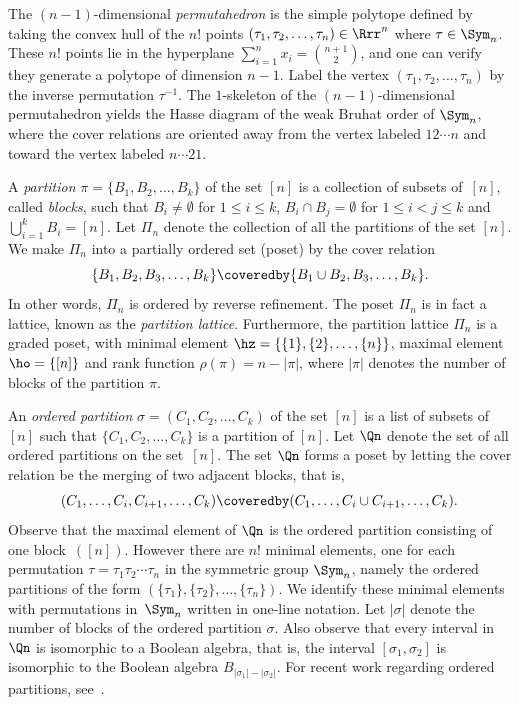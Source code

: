 The $(n-1)$-dimensional
\emph{permutahedron} 
is the simple polytope defined by
taking the convex hull of the $n!$ points 
$(\tau_{1}, \tau_{2}, \ldots, \tau_{n}) \in \Rrr^{n}$
where $\tau \in \Sym_{n}$.
These $n!$ points lie in the hyperplane
$\sum_{i=1}^{n} x_{i} = \binom{n+1}{2}$,
and one can verify
they generate a
polytope of dimension $n-1$.
Label the vertex
$(\tau_{1}, \tau_{2}, \ldots, \tau_{n})$ by the inverse permutation $\tau^{-1}$.
The $1$-skeleton of the $(n-1)$-dimensional permutahedron
yields the Hasse diagram of the weak Bruhat order of $\Sym_{n}$,
where the cover relations are oriented away from
the vertex labeled $12 \cdots n$ and toward the vertex labeled $n \cdots 21$.




A \emph{partition} $\pi = \{B_{1}, B_{2}, \ldots, B_{k}\}$
of the set $[n]$ is a collection of subsets of~$[n]$, called \emph{blocks},
such that $B_{i} \neq \emptyset$ for $1 \leq i \leq k$,
$B_{i} \cap B_{j} = \emptyset$ for $1 \leq i < j \leq k$
and
$\bigcup_{i=1}^{k} B_{i} = [n]$.
Let $\Pi_{n}$ denote
the collection of all the partitions of the set $[n]$.
We make $\Pi_{n}$ into a partially ordered set (poset)
by the cover relation
$$
  \{B_{1}, B_{2}, B_{3}, \ldots, B_{k}\}
  \coveredby
  \{B_{1} \cup B_{2}, B_{3}, \ldots, B_{k}\} .
$$
In other words, $\Pi_{n}$ is ordered by reverse refinement.
The poset $\Pi_{n}$ is in fact a lattice,
known as the \emph{partition lattice}.
Furthermore, the partition lattice $\Pi_{n}$ is a graded poset,
with minimal element
$\hz = \{\{1\}, \{2\}, \ldots, \{n\}\}$,
maximal element
$\ho = \{[n]\}$
and rank function
$\rho(\pi) = n-|\pi|$,
where
$|\pi|$ denotes the number of blocks of the partition $\pi$.



An \emph{ordered partition} 
$\sigma = (C_{1}, C_{2}, \ldots, C_{k})$
of the set $[n]$
is a list of subsets of $[n]$ such that
$\{C_{1}, C_{2}, \ldots, C_{k}\}$
is a partition of $[n]$.
Let $\Qn$ denote the set of all
ordered partitions on the set~$[n]$.
The set $\Qn$ forms a poset
by letting the cover relation
be the merging of two adjacent blocks, that is,
$$
(C_{1}, \ldots, C_{i}, C_{i+1}, \ldots, C_{k})
\coveredby
(C_{1}, \ldots, C_{i} \cup C_{i+1}, \ldots, C_{k}) .
$$
Observe that the maximal element of
$\Qn$ is
the ordered partition consisting of one block~$([n])$.
However there are $n!$ minimal elements,
one for each permutation $\tau = \tau_{1} \tau_{2} \cdots \tau_{n}$
in the symmetric group $\Sym_{n}$, namely
the ordered partitions of the form
$(\{\tau_{1}\}, \{\tau_{2}\}, \ldots, \{\tau_{n}\})$.
We identify these minimal elements with
permutations in~$\Sym_{n}$ written in one-line notation.
Let $|\sigma|$ denote the number of blocks of the ordered partition $\sigma$.
Also observe that every interval in $\Qn$ is isomorphic
to a Boolean algebra,
that is,
the interval $[\sigma_{1},\sigma_{2}]$
is isomorphic to the Boolean algebra $B_{|\sigma_{1}| - |\sigma_{2}|}$.
For recent work regarding ordered partitions, 
see~\cite{Ehrenborg_Hedmark,Ehrenborg_Jung}.

